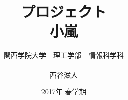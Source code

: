 \title{プロジェクト\\
\vspace{4cm} 小嵐}
\author{ 関西学院大学　理工学部　情報科学科\\\\西谷滋人}
\date{\vspace{3cm} 2017年  春学期}
\maketitle
\setcounter{tocdepth}{6}
\tableofcontents

